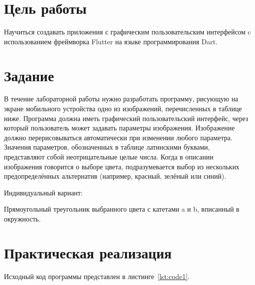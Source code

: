 \documentclass[a4paper, 14pt]{extarticle}
\begin{document}
\renewcommand{\ttdefault}{pcr}

\setlength{\tabcolsep}{3pt}
\newpage
\setcounter{page}{2}

\section{Цель работы}\label{Sect::goal}

Научиться создавать приложения с графическим пользовательским интерфейсом c использованием фреймворка Flutter на языке программирования Dart.

\section{Задание}\label{Sect::task}

В течение лабораторной работы нужно разработать программу, рисующую на экране
мобильного устройства одно из изображений, перечисленных в таблице ниже. Программа
должна иметь графический пользовательский интерфейс, через который пользователь может
задавать параметры изображения. Изображение должно перерисовываться автоматически при
изменении любого параметра. Значения параметров, обозначенных в таблице латинскими
буквами, представляют собой неотрицательные целые числа. Когда в описании изображения
говорится о выборе цвета, подразумевается выбор из нескольких предопределённых
альтернатив (например, красный, зелёный или синий).

Индивидуальный вариант:

Прямоугольный треугольник выбранного цвета с катетами a и b, вписанный в окружность.

\section{Практическая реализация}\label{Sect::code}

Исходный код программы представлен в листинге~\ref{lst:code1}.
\end{document}
